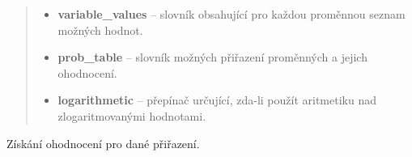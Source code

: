 \begin{fulllineitems}
\begin{fulllineitems}
\begin{quote}
\begin{description}
\begin{itemize}
\item {} 
\textbf{variable\_values} -- slovník obsahující pro každou proměnnou seznam možných hodnot.

\item {} 
\textbf{prob\_table} -- slovník možných přiřazení proměnných a jejich ohodnocení.

\item {} 
\textbf{logarithmetic} -- přepínač určující, zda-li použít aritmetiku nad zlogaritmovanými hodnotami.

\end{itemize}

\end{description}\end{quote}

\end{fulllineitems}


\begin{fulllineitems}
\label{alex.infer:alex.infer.factor.Factor.__getitem__}
Získání ohodnocení pro dané přiřazení.


\end{fulllineitems}
\end{fulllineitems}
